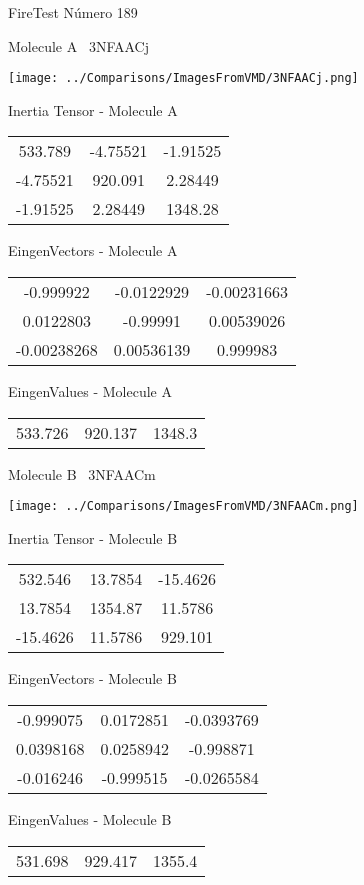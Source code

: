\vtab[-3cm]
\begin{center}
{\large FireTest \tab Número 189}
\end{center}
\begin{multicols}{2}
\begin{center}

Molecule A \
3NFAACj

\texttt{[image: ../Comparisons/ImagesFromVMD/3NFAACj.png]}

Inertia Tensor - Molecule A \\
\begin{tabular}{|c c c|}
533.789	 & 	-4.75521	 & 	-1.91525	 \\
-4.75521	 & 	920.091	 & 	2.28449	 \\
-1.91525	 & 	2.28449	 & 	1348.28
\end{tabular}

\vtab
 EingenVectors - Molecule A     \\
\begin{tabular}{|c c c|}
-0.999922	 & 	-0.0122929	 & 	-0.00231663	 \\
0.0122803	 & 	-0.99991	 & 	0.00539026	 \\
-0.00238268	 & 	0.00536139	 & 	0.999983
\end{tabular}

\vtab
 EingenValues - Molecule A     \\
\begin{tabular}{|c c c|}
533.726	 & 	920.137	 & 	1348.3	 \\
\end{tabular}
\columnbreak

Molecule B \
3NFAACm

\texttt{[image: ../Comparisons/ImagesFromVMD/3NFAACm.png]}

Inertia Tensor - Molecule B \\
\begin{tabular}{|c c c|}
532.546	 & 	13.7854	 & 	-15.4626	 \\
13.7854	 & 	1354.87	 & 	11.5786	 \\
-15.4626	 & 	11.5786	 & 	929.101
\end{tabular}

\vtab
 EingenVectors - Molecule B     \\
\begin{tabular}{|c c c|}
-0.999075	 & 	0.0172851	 & 	-0.0393769	 \\
0.0398168	 & 	0.0258942	 & 	-0.998871	 \\
-0.016246	 & 	-0.999515	 & 	-0.0265584
\end{tabular}

\vtab
 EingenValues - Molecule B     \\
\begin{tabular}{|c c c|}
531.698	 & 	929.417	 & 	1355.4	 \\
\end{tabular}

\end{center}
\end{multicols}

